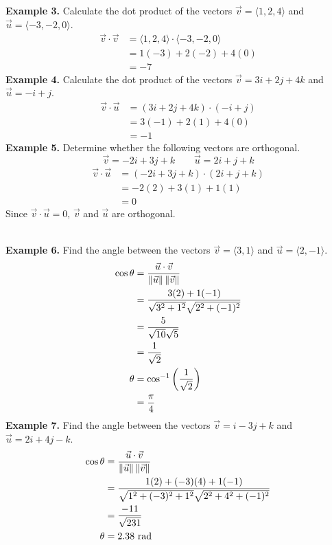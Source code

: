 \noindent\textbf{Example 3. } Calculate the dot product of the vectors $\vec{v} = \langle 1, 2, 4 \rangle$ and $\vec{u} = \langle -3, -2, 0 \rangle$.
\begin{align*}
    \vec{v} \cdot \vec{v} & = \langle 1, 2, 4 \rangle \cdot \langle -3, -2, 0 \rangle \\
                          & = 1(-3) + 2(-2) + 4(0)                                    \\
                          & = -7
\end{align*}
\noindent\textbf{Example 4. } Calculate the dot product of the vectors $\vec{v} = 3i + 2j + 4k$ and $\vec{u} = -i + j$.
\begin{align*}
    \vec{v} \cdot \vec{u} & = (3i + 2j + 4k) \cdot (-i + j) \\
                          & = 3(-1) + 2(1) + 4(0)           \\
                          & = -1
\end{align*}
\noindent\textbf{Example 5. } Determine whether the following vectors are orthogonal. \[\vec{v} = -2i + 3j + k \qquad \vec{u} = 2i + j + k\]
\begin{align*}
    \vec{v} \cdot \vec{u} & = (-2i + 3j + k) \cdot (2i + j + k) \\
                          & = -2(2) + 3(1) + 1(1)               \\
                          & = 0
\end{align*}
Since $\vec{v} \cdot \vec{u} = 0$, $\vec{v}$ and $\vec{u}$ are orthogonal.

~\\\noindent\textbf{Example 6. } Find the angle between the vectors $\vec{v} = \langle 3, 1 \rangle$ and $\vec{u} = \langle 2, -1 \rangle$.
\begin{align*}
    \cos\theta & = \frac{\vec{u} \cdot \vec{v}}{\left\lVert\vec{u}\right\rVert \left\lVert\vec{v}\right\rVert} \\
               & = \frac{3(2) + 1(-1)}{\sqrt{3^2 + 1^2}\sqrt{2^2 + (-1)^2}}    \\
               & = \frac{5}{\sqrt{10}\sqrt{5}}                                 \\
               & = \frac{1}{\sqrt{2}}                                          \\
    \theta     & = \cos^{-1}\left(\frac{1}{\sqrt{2}}\right)                    \\
               & = \frac{\pi}{4}
\end{align*}
\noindent\textbf{Example 7. } Find the angle between the vectors $\vec{v} = i - 3j + k$ and $\vec{u} = 2i + 4j - k$.
\begin{align*}
    \cos\theta & = \frac{\vec{u} \cdot \vec{v}}{\left\lVert\vec{u}\right\rVert \left\lVert\vec{v}\right\rVert}                       \\
               & = \frac{1(2) + (-3)(4) + 1(-1)}{\sqrt{1^2 + (-3)^2 + 1^2}\sqrt{2^2 + 4^2 + (-1)^2}} \\
               & = \frac{-11}{\sqrt{231}}                                                            \\
    \theta     & = 2.38 \text{ rad}
\end{align*}

